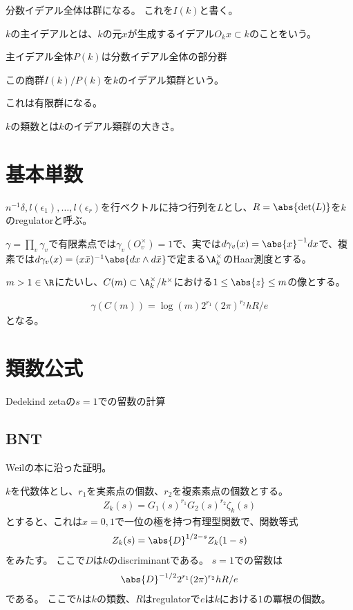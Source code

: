\documentclass[uplatex, a4paper]{jsbook}
\begin{document}
分数イデアル全体は群になる。
これを$I(k)$と書く。

$k$の主イデアルとは、$k$の元$x$が生成するイデアル$O_kx \subset k$のことをいう。

主イデアル全体$P(k)$は分数イデアル全体の部分群

\begin{dfn}
この商群$I(k)/P(k)$を$k$のイデアル類群という。
\end{dfn}

これは有限群になる。

$k$の類数とは$k$のイデアル類群の大きさ。

\section{基本単数}

\begin{dfn}[Definition 7, p.94]
$n^{-1}\delta, l(\epsilon_1),\ldots,l(\epsilon_r)$を行ベクトルに持つ行列を$L$とし、$R=\abs{\det(L)}$を$k$のregulatorと呼ぶ。
\end{dfn}

\begin{prop}[Proposition 9, p.95]
$\gamma=\prod_v\gamma_v$で有限素点では$\gamma_v(O_v^\times)=1$で、実では$d\gamma_v(x)=\abs{x}^{-1}dx$で、複素では$d\gamma_v(x)=(x\bar{x})^{-1}\abs{dx\wedge d\bar{x}}$で定まる$\A_k^\times$のHaar測度とする。

$m>1 \in \R$にたいし、$C(m) \subset \A_k^\times / k^\times$における$1\leq \abs{z}\leq m$の像とする。

\begin{align*}
\gamma(C(m)) = \log(m)2^{r_1}(2\pi)^{r_2}hR/e
\end{align*}
となる。
\end{prop}
\section{類数公式}
Dedekind zetaの$s=1$での留数の計算

\subsection{BNT}
Weilの本に沿った証明。

\begin{thm}[Theoerm 3, p.129]
$k$を代数体とし、$r_1$を実素点の個数、$r_2$を複素素点の個数とする。
\begin{align*}
Z_k(s)=G_1(s)^{r_1}G_2(s)^{r_2}\zeta_k(s)
\end{align*}
とすると、これは$x=0, 1$で一位の極を持つ有理型関数で、関数等式
\begin{align*}
Z_k(s)=\abs{D}^{1/2-s}Z_k(1-s)
\end{align*}
をみたす。
ここで$D$は$k$のdiscriminantである。
$s=1$での留数は
\begin{align*}
\abs{D}^{-1/2}2^{r_1}(2\pi)^{r_2}hR/e
\end{align*}
である。
ここで$h$は$k$の類数、$R$はregulatorで$e$は$k$における$1$の冪根の個数。
\end{thm}
\end{document}

